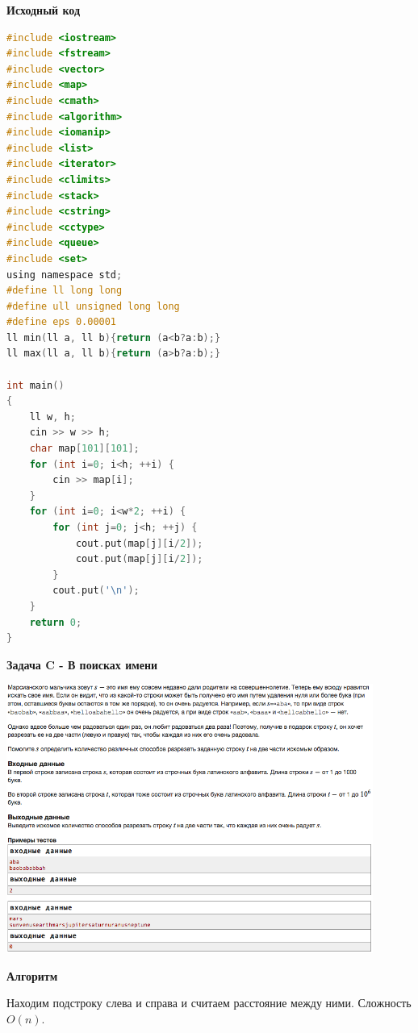 \documentclass[a4paper,12pt]{article}
\begin{document}
\textbf{{\large Исходный код}} \\
\begin{lstlisting}[language=C]
#include <iostream>
#include <fstream>
#include <vector>
#include <map>
#include <cmath>
#include <algorithm>
#include <iomanip>
#include <list>
#include <iterator>
#include <climits>
#include <stack>
#include <cstring>
#include <cctype>
#include <queue>
#include <set>
using namespace std;
#define ll long long
#define ull unsigned long long
#define eps 0.00001
ll min(ll a, ll b){return (a<b?a:b);}
ll max(ll a, ll b){return (a>b?a:b);}

int main()
{
    ll w, h;
    cin >> w >> h;
    char map[101][101];
    for (int i=0; i<h; ++i) {
        cin >> map[i];
    }
    for (int i=0; i<w*2; ++i) {
        for (int j=0; j<h; ++j) {
            cout.put(map[j][i/2]);
            cout.put(map[j][i/2]);
        }
        cout.put('\n');
    }
    return 0;
}
\end{lstlisting}
\newpage
\textbf{{\large Задача C - В поисках имени}} \\
\begin{center}
\includegraphics[width=0.9\textwidth]{VK_Qual_2/VK_Qual_C.png}\\ [1cm]
\end{center}

\textbf{{\large Алгоритм}}

Находим подстроку слева и справа и считаем расстояние между ними. Сложность $O(n)$.\\
\end{document}
